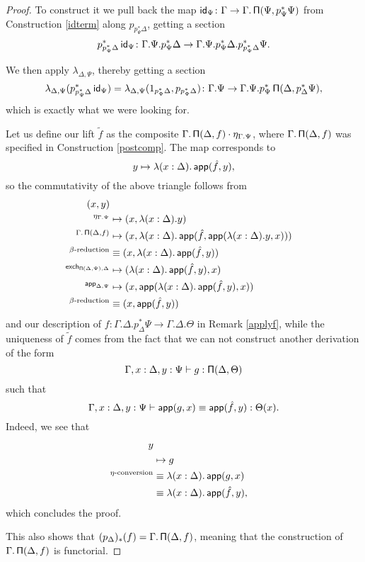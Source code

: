 \begin{proof}
\noindent
  To construct it we pull back the map
  $\operatorname{\mathsf{id}}_{\Psi}\colon\Gamma\rightarrow\Gamma.\operatorname{\mathsf{\Pi}}(\Psi,p^*_\Psi\Psi)$ from
  Construction \ref{idterm} along $p_{p^*_\Psi\Delta}$, getting a section
  \[p^*_{p^*_\Psi\Delta}\operatorname{\mathsf{id}}_{\Psi}\colon\Gamma.\Psi.p^*_\Psi\Delta\rightarrow\Gamma.\Psi.p^*_\Psi\Delta.p^*_{p^*_\Psi\Delta}\Psi.\]

\noindent
  We then apply $\lambda_{\Delta,\Psi}$, thereby getting a section
  \[\lambda_{\Delta,\Psi}(p^*_{p^*_\Psi\Delta}\operatorname{\mathsf{id}}_\Psi)
    =\lambda_{\Delta,\Psi}(1_{p^*_\Psi\Delta},p_{p^*_\Psi\Delta})
\colon\Gamma.\Psi\rightarrow\Gamma.\Psi.p^*_\Psi\operatorname{\mathsf{\Pi}}(\Delta,p^*_\Delta\Psi),\]
  which is exactly what we were looking for.

  \noindent
  Let us define our lift $\tilde{f}$ as the composite
  $\Gamma.\operatorname{\mathsf{\Pi}}(\Delta,f)\cdot\eta_{\Gamma.\Psi}$, where $\Gamma.\operatorname{\mathsf{\Pi}}(\Delta,f)$
  was specified in Construction \ref{postcomp}. The map corresponds to
  \[y\mapsto\lambda(x:\Delta).\operatorname{\mathsf{app}}(\hat{f},y),\] so the commutativity of the
  above triangle follows from
  \begin{align*}
    (x,y) \\
    ^{\eta_{\Gamma.\Psi}}
    &\mapsto(x,\lambda(x:\Delta).y) \\
    ^{\Gamma.\operatorname{\mathsf{\Pi}}(\Delta,f)}
    &\mapsto(x,\lambda(x:\Delta).\operatorname{\mathsf{app}}(\hat{f},\operatorname{\mathsf{app}}(\lambda(x:\Delta).y,x))) \\
    ^{\beta\text{-reduction}}
    &\equiv(x,\lambda(x:\Delta).\operatorname{\mathsf{app}}(\hat{f},y)) \\
    ^{\operatorname{\mathsf{exch}}_{\operatorname{\mathsf{\Pi}}(\Delta,\Psi),\Delta}}
    &\mapsto(\lambda(x:\Delta).\operatorname{\mathsf{app}}(\hat{f},y),x) \\
    ^{\operatorname{\mathsf{app}}_{\Delta,\Psi}}
    &\mapsto(x,\operatorname{\mathsf{app}}(\lambda(x:\Delta).\operatorname{\mathsf{app}}(\hat{f},y),x)) \\
    ^{\beta\text{-reduction}}
    &\equiv(x,\operatorname{\mathsf{app}}(\hat{f},y))
  \end{align*}
  and our description of
  $f\colon\Gamma.\Delta.p^*_\Delta\Psi\rightarrow\Gamma.\Delta.\Theta$ in
  Remark \ref{applyf}, while the
  uniqueness of $\tilde{f}$ comes from the fact that we can not construct
  another derivation of the form
  \[\Gamma,x:\Delta,y:\Psi\vdash g:\operatorname{\mathsf{\Pi}}(\Delta,\Theta)\]
  such that
  \[\Gamma,x:\Delta,y:\Psi\vdash\operatorname{\mathsf{app}}(g,x)\equiv\operatorname{\mathsf{app}}(\hat{f},y):\Theta(x).\]
  Indeed, we see that
  \begin{align*}
    y \\
        &\mapsto g \\
        ^{\eta\text{-conversion}}&\equiv\lambda(x:\Delta).\operatorname{\mathsf{app}}(g,x) \\
                                 &\equiv\lambda(x:\Delta).\operatorname{\mathsf{app}}(\hat{f},y),
  \end{align*}
  which concludes the proof.

  \noindent
  This also shows that $(p_{\Delta})_*(f)=\Gamma.\operatorname{\mathsf{\Pi}}(\Delta,f)$, meaning that
  the construction of $\Gamma.\operatorname{\mathsf{\Pi}}(\Delta,f)$ is functorial.
\end{proof}

